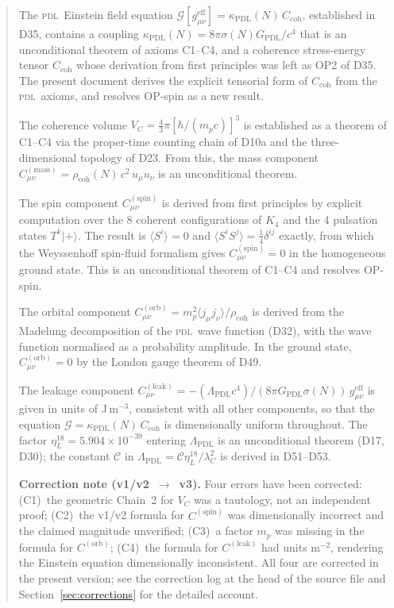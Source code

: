 \documentclass[12pt,a4paper]{article}
\newcommand{\Kfour}{K_4}
\newcommand{\hb}{\hbar}
\newcommand{\PDL}{\textsc{pdl}}
\newcommand{\Ccoh}{C_{\mathrm{coh}}}
\newcommand{\Cmass}{C^{(\mathrm{mass})}}
\newcommand{\Cspin}{C^{(\mathrm{spin})}}
\newcommand{\Corb}{C^{(\mathrm{orb})}}
\newcommand{\Cleak}{C^{(\mathrm{leak})}}
\newcommand{\rhocoh}{\rho_{\mathrm{coh}}}
\newcommand{\sig}{\sigma}
\newcommand{\kPDL}{\kappa_{\mathrm{PDL}}}
\newcommand{\GPDL}{G_{\mathrm{PDL}}}
\newcommand{\geff}{g_{\mu\nu}^{\mathrm{eff}}}
\newcommand{\lambdaC}{\lambda_C}
\newcommand{\VC}{V_C}
\newcommand{\etaL}{\eta_L}
\newcommand{\LambdaPDL}{\Lambda_{\mathrm{PDL}}}
\begin{document}
\begin{abstract}
The \PDL\ Einstein field equation $\mathcal{G}[\geff] = \kPDL(N)\,\Ccoh$, established in D35, contains a coupling $\kPDL(N) = 8\pi\sig(N)\GPDL/c^4$ that is an unconditional theorem of axioms C1--C4, and a coherence stress-energy tensor $\Ccoh$ whose derivation from first principles was left as OP2 of D35. The present document derives the explicit tensorial form of $\Ccoh$ from the \PDL\ axioms, and resolves OP-spin as a new result.

The coherence volume $\VC = \tfrac{4}{3}\pi[\hb/(m_p c)]^3$ is established as a theorem of C1--C4 via the proper-time counting chain of D10a and the three-dimensional topology of D23. From this, the mass component $\Cmass_{\mu\nu} = \rhocoh(N)\,c^2\,u_\mu u_\nu$ is an unconditional theorem.

The spin component $\Cspin_{\mu\nu}$ is derived from first principles by explicit computation over the 8 coherent configurations of $\Kfour$ and the 4 pulsation states $T^k|{+}\rangle$. The result is $\langle S^i\rangle = 0$ and $\langle S^i S^j\rangle = \tfrac{1}{4}\delta^{ij}$ exactly, from which the Weyssenhoff spin-fluid formalism gives $\Cspin_{\mu\nu} = 0$ in the homogeneous ground state. This is an unconditional theorem of C1--C4 and resolves OP-spin.

The orbital component $\Corb_{\mu\nu} = m_p^2\langle j_\mu j_\nu\rangle/\rhocoh$ is derived from the Madelung decomposition of the \PDL\ wave function (D32), with the wave function normalised as a probability amplitude. In the ground state, $\Corb_{\mu\nu} = 0$ by the London gauge theorem of D49.

The leakage component $\Cleak_{\mu\nu} = -(\LambdaPDL c^4)/(8\pi\GPDL\sig(N))\,\geff$ is given in units of J\,m$^{-3}$, consistent with all other components, so that the equation $\mathcal{G} = \kPDL(N)\,\Ccoh$ is dimensionally uniform throughout. The factor $\etaL^{18} = 5.904\times10^{-39}$ entering $\LambdaPDL$ is an unconditional theorem (D17, D30); the constant $\mathcal{C}$ in $\LambdaPDL = \mathcal{C}\etaL^{18}/\lambdaC^2$ is derived in D51--D53.

\medskip\noindent\textbf{Correction note (v1/v2~$\to$~v3).} Four errors have been corrected: (C1)~the geometric Chain~2 for $\VC$ was a tautology, not an independent proof; (C2)~the v1/v2 formula for $\Cspin$ was dimensionally incorrect and the claimed magnitude unverified; (C3)~a factor $m_p$ was missing in the formula for $\Corb$; (C4)~the formula for $\Cleak$ had units m$^{-2}$, rendering the Einstein equation dimensionally inconsistent. All four are corrected in the present version; see the correction log at the head of the source file and Section~\ref{sec:corrections} for the detailed account.
\end{abstract}
\end{document}
